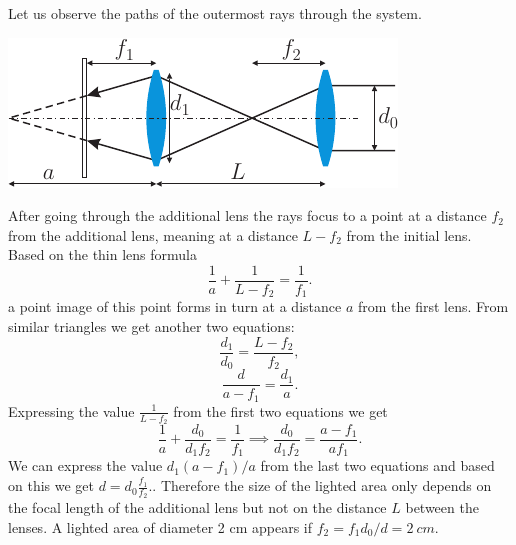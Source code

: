 \documentclass[11pt]{article}
\begin{document}
\solueng
Let us observe the paths of the outermost rays through the system.
\begin{center}
\includegraphics[scale=1.5]{2015-v3g-02-valgustamine-lah}
\end{center}
After going through the additional lens the rays focus to a point at a distance $f_2$ from the additional lens, meaning at a distance $L-f_2$ from the initial lens. Based on the thin lens formula
\begin{equation}
\frac{1}{a}+\frac{1}{L-f_2}=\frac{1}{f_1}.
\end{equation} 
a point image of this point forms in turn at a distance $a$ from the first lens. From similar triangles we get another two equations:
\begin{equation}
\frac{d_1}{d_0}=\frac{L-f_2}{f_2},
\end{equation} 
\begin{equation}
\frac{d}{a-f_1}=\frac{d_1}{a}.
\end{equation}
Expressing the value $\frac{1}{L-f_2}$ from the first two equations we get
\begin{equation}
\frac{1}{a}+\frac{d_0}{d_1f_2}=\frac{1}{f_1}\implies \frac{d_0}{d_1f_2}=\frac{a-f_1}{af_1}.
\end{equation} 
We can express the value $d_1(a-f_1)/a$ from the last two equations and based on this we get $d=d_0\frac{f_1}{f_2}.$. Therefore the size of the lighted area only depends on the focal length of the additional lens but not on the distance $L$ between the lenses. A lighted area of diameter 2 cm appears if $f_2=f_1d_0/d=\SI{2}{cm}$.
\probend
\bigskip

\end{document}
